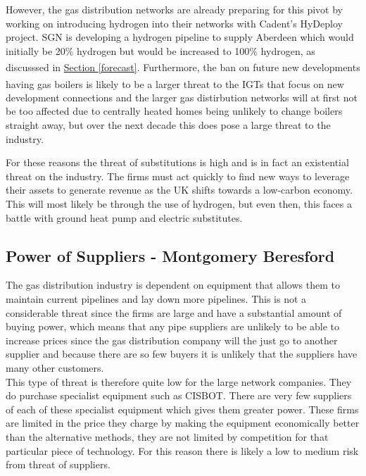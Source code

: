 \documentclass[11pt]{article}		%
\newcommand{\supercite}[1]{\textsuperscript{\cite{#1}}}		%
\newcommand{\sectref}[1]{\hyperref[#1]{Section \ref*{#1}}}     %
\begin{document}
                However, the gas distribution networks are already preparing for this pivot by working on introducing hydrogen into their networks with Cadent’s HyDeploy project. SGN is developing a hydrogen pipeline to supply Aberdeen which would initially be 20\% hydrogen but would be increased to 100\% hydrogen, as discusssed in \sectref{forecast}. \supercite{Cadent_Plan}
               Furthermore, the ban on future new developments having gas boilers \supercite{boiler_ban} is likely to be a larger threat to the IGTs that focus on new development connections and the larger gas distirbution networks will at first not be too affected due to centrally heated homes being unlikely to change boilers straight away, but over the next decade this does pose a large threat to the industry.
              
                For these reasons the threat of substitutions is high and is in fact an existential threat on the industry. The firms must act quickly to find new ways to leverage their assets to generate revenue as the UK shifts towards a low-carbon economy. This will most likely be through the use of hydrogen, but even then, this faces a battle with ground heat pump and electric substitutes.

     
		\subsection[Power of Suppliers]{Power of Suppliers - Montgomery Beresford}
		        The gas distribution industry is dependent on equipment that allows them to maintain current pipelines and lay down more pipelines. 
		        This is not a considerable threat since the firms are large and have a substantial amount of buying power, which means that any pipe suppliers are unlikely to be able to increase prices since the gas distribution company will the just go to another supplier and because there are so few buyers it is unlikely that the suppliers have many other customers. 
		        \\
		        This type of threat is therefore quite low for the large network companies.
                They do purchase specialist equipment such as CISBOT. There are very few suppliers of each of these specialist equipment which gives them greater power. These firms are limited in the price they charge by making the equipment economically better than the alternative methods, they are not limited by competition for that particular piece of technology.
                For this reason there is likely a low to medium risk from threat of suppliers.
\end{document}
